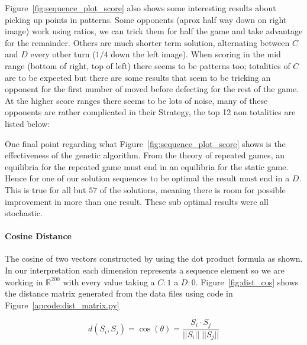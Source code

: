 Figure~\ref{fig:sequence_plot_score} also shows some interesting results about picking up points in patterns.
Some opponents (aprox half way down on right image) work using ratios, we can trick them for half the game and take advantage for the remainder.
Others are much shorter term solution, alternating between $C$ and $D$ every other turn ($1/4$ down the left image).
When scoring in the mid range (bottom of right, top of left) there seems to be patterns too; totalities of $C$ are to be expected but there are some results that seem to be tricking an opponent for the first number of moved before defecting for the rest of the game.
At the higher score ranges there seems to be lots of noise, many of these opponents are rather complicated in their Strategy, the top 12 non totalities are listed below:

One final point regarding what Figure~\ref{fig:sequence_plot_score} shows is the effectiveness of the genetic algorithm.
From the theory of repeated games, an equilibria for the repeated game must end in an equilibria for the static game.
Hence for one of our solution sequences to be optimal the result must end in a $D$. 
This is true for all but $57$ of the solutions, meaning there is room for possible improvement in more than one result.
These sub optimal results were all stochastic.

\paragraph{Cosine Distance}\cite{bora2014effect}
The cosine of two vectors constructed by using the dot product formula as shown.
In our interpretation each dimension represents a sequence element so we are working in $\mathbb{R}^{200}$ with every value taking a $C:1$ a $D:0$.
Figure~\ref{fig:dist_cos} shows the distance matrix generated from the data files using code in Figure~\ref{apcode:dist_matrix.py}

$$ d(S_i,S_j) = \cos(\theta) = \frac{{S_i} \cdot {S_j}}{|| {S_i} || \; || {S_j} ||} $$

